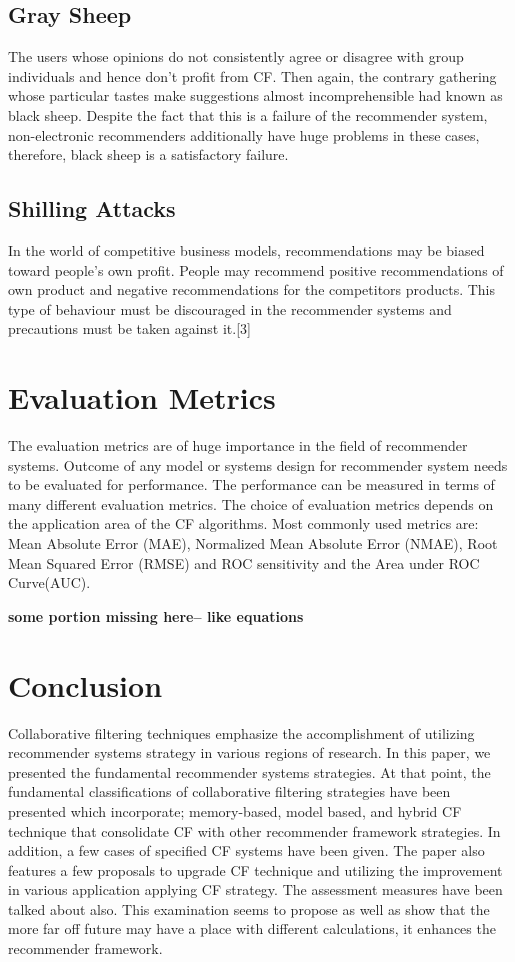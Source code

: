 \documentclass[10pt,conference]{IEEEtran}
\begin{document}
\subsection{Gray Sheep}
The users whose opinions do not consistently agree or disagree with group individuals and hence don't profit from CF. Then again, the contrary gathering whose particular tastes make suggestions almost incomprehensible had known as black sheep. Despite the fact that this is a failure of the recommender system, non-electronic recommenders additionally have huge problems in these cases, therefore, black sheep is a satisfactory failure.

\subsection{Shilling Attacks}
In the world of competitive business models, recommendations may be biased toward people's own profit. People may recommend positive recommendations of own product and negative recommendations for the competitors products. This type of behaviour must be discouraged in the recommender systems and precautions must be taken against it.[3]


\section{Evaluation Metrics}

The evaluation metrics are of huge importance in the field of recommender systems. Outcome of any model or systems design for recommender system needs to be evaluated for performance. The performance can be measured in terms of many different evaluation metrics. The choice of evaluation metrics depends on the application area of the CF algorithms. Most commonly used metrics are: Mean Absolute Error (MAE), Normalized Mean Absolute Error (NMAE), Root Mean Squared Error (RMSE) and ROC sensitivity and the Area under ROC Curve(AUC).

\textbf{some portion missing here-- like equations}

\section{Conclusion}
Collaborative filtering techniques emphasize the accomplishment of utilizing recommender systems strategy in various regions of research. In this paper, we presented the fundamental recommender systems strategies. At that point, the fundamental classifications of collaborative filtering strategies have been presented which incorporate; memory-based, model based, and hybrid CF technique that consolidate CF with other recommender framework strategies. In addition, a few cases of specified CF systems have been given. The paper also features a few proposals to upgrade CF technique and utilizing the improvement in various application applying CF strategy. The assessment measures have been talked about also. This examination seems to propose as well as show that the more far off future may have a place with different calculations, it enhances the recommender framework.



\newpage






\end{document}
